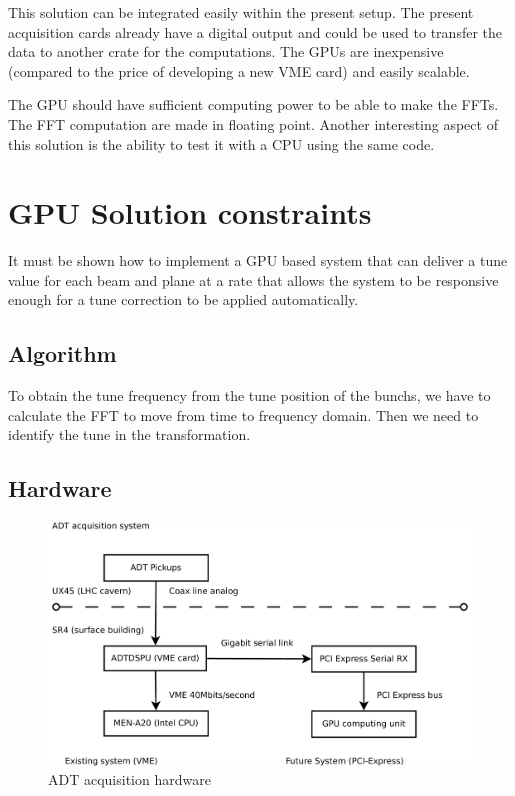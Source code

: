 This solution can be integrated easily within the present setup. The present acquisition cards already have a digital output and could be used to transfer the data to another crate for the computations. The \glspl{GPU} are inexpensive (compared to the price of developing a new \gls{VME} card) and easily scalable. 

The \gls{GPU} should have sufficient computing power to be able to make the \glspl{FFT}. The \gls{FFT} computation are made in floating point. Another interesting aspect of this solution is the ability to test it with a \gls{CPU} using the same code.

\section{GPU Solution constraints}

It must be shown how to implement a GPU based system that can deliver a tune value for each beam and plane at a rate that allows the system to be responsive enough for a tune correction to be applied automatically.

\subsection{Algorithm}

To obtain the tune frequency from the tune position of the \glspl{bunch}, we have to calculate the FFT to move from time to frequency domain. Then we need to identify the tune in the transformation.

\subsection{Hardware}

\begin{figure}[H]
\caption{ADT acquisition hardware}
\centering
\includegraphics[scale=0.3]{acquisition.pdf}
\end{figure}

